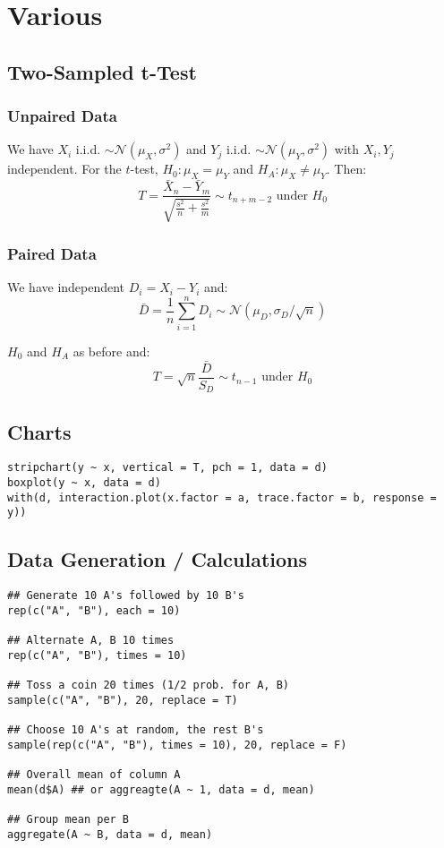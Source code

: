\section{Various}


\subsection{Two-Sampled t-Test}

\subsubsection{Unpaired Data}

We have $X_i$ i.i.d. $\sim \mathcal N(\mu_X, \sigma^2)$ and $Y_j$ i.i.d. $\sim \mathcal N(\mu_Y, \sigma^2)$ with $X_i, Y_j$ independent. For the $t$-test, $H_0: \mu_X = \mu_Y$ and $H_A: \mu_X \neq \mu_Y$. Then:
$$T = \frac{\bar X_n - \bar Y_m}{\sqrt{\frac{s^2}{n} + \frac{s^2}{m}}} \sim t_{n+m-2} \text{ under } H_0$$

\subsubsection{Paired Data}

We have independent $D_i = X_i - Y_i$ and:
$$\bar D = \frac{1}{n} \sum_{i=1}^n D_i \sim \mathcal N(\mu_D, \sigma_D / \sqrt{n})$$

$H_0$ and $H_A$ as before and:
$$T = \sqrt{n} \frac{\bar D}{S_D} \sim t_{n-1} \text{ under } H_0$$

\subsection{Charts}

\begin{lstlisting}
stripchart(y ~ x, vertical = T, pch = 1, data = d)
boxplot(y ~ x, data = d)
with(d, interaction.plot(x.factor = a, trace.factor = b, response = y))
\end{lstlisting}


\subsection{Data Generation / Calculations}
\begin{lstlisting}
## Generate 10 A's followed by 10 B's
rep(c("A", "B"), each = 10)

## Alternate A, B 10 times
rep(c("A", "B"), times = 10)

## Toss a coin 20 times (1/2 prob. for A, B)
sample(c("A", "B"), 20, replace = T)

## Choose 10 A's at random, the rest B's
sample(rep(c("A", "B"), times = 10), 20, replace = F)

## Overall mean of column A
mean(d$A) ## or aggreagte(A ~ 1, data = d, mean)

## Group mean per B
aggregate(A ~ B, data = d, mean)
\end{lstlisting}


